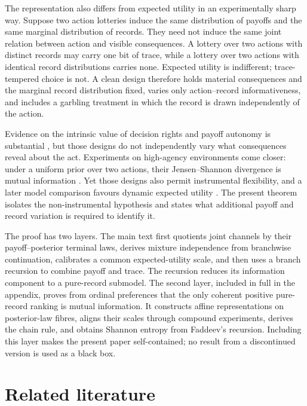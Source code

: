 \documentclass[11pt,a4paper]{article}
\theoremstyle{definition}
\newcommand{\1}{\mathbf 1}
\begin{document}
The representation also differs from expected utility in an experimentally sharp way.  Suppose two action lotteries
induce the same distribution of payoffs and the same marginal distribution of records.  They need not induce the same
joint relation between action and visible consequences.  A lottery over two actions with distinct records may carry
one bit of trace, while a lottery over two actions with identical record distributions carries none.  Expected utility
is indifferent; trace-tempered choice is not.  A clean design therefore holds material consequences and the marginal
record distribution fixed, varies only action--record informativeness, and includes a garbling treatment in which the
record is drawn independently of the action.

Evidence on the intrinsic value of decision rights and payoff autonomy is substantial
\cite{BartlingFehrHerz2014,BuffatPraxmarerSutter2023,OwensGrossmanFackler2014}, but those designs do not independently
vary what consequences reveal about the act.  Experiments on high-agency environments come closer: under a uniform
prior over two actions, their Jensen--Shannon divergence is mutual information
\cite{MistryLiljeholm2016,NortonLiljeholm2020}.  Yet those designs also permit instrumental flexibility, and a later
model comparison favours dynamic expected utility \cite{Liljeholm2022}.  The present theorem isolates the
non-instrumental hypothesis and states what additional payoff and record variation is required to identify it.

The proof has two layers.  The main text first quotients joint channels by their payoff--posterior terminal laws,
derives mixture independence from branchwise continuation, calibrates a common expected-utility scale, and then uses a
branch recursion to combine payoff and trace.  The recursion reduces its information component to a pure-record
submodel.  The second layer, included in full in the appendix, proves from ordinal preferences that the only coherent
positive pure-record ranking is mutual information.  It constructs affine representations on posterior-law fibres,
aligns their scales through compound experiments, derives the chain rule, and obtains Shannon entropy from Faddeev's
recursion.  Including this layer makes the present paper self-contained; no result from a discontinued version is
used as a black box.

\section{Related literature}
\end{document}
